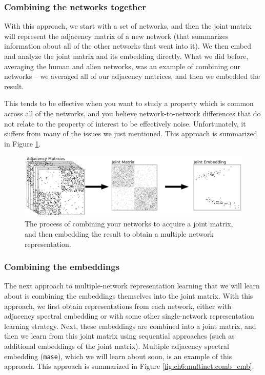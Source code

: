 \subsubsection{Combining the networks together}

With this approach, we start with a set of networks, and then the joint matrix will represent the adjacency matrix of a new network (that summarizes information about all of the other networks that went into it). We then embed and analyze the joint matrix and its embedding directly. What we did before, averaging the human and alien networks, was an example of combining our networks -- we  averaged all of our adjacency matrices, and then we embedded the result. 

This tends to be effective when you want to study a property which is common across all of the networks, and you believe network-to-network differences that do not relate to the property of interest to be effectively noise. Unfortunately, it suffers from many of the issues we just mentioned. This approach is summarized in Figure \ref{fig:ch6:multinet:comb}.

\begin{figure}[h]
    \centering
    \includegraphics[width=\linewidth]{representations/ch6/Images/joint_comb.png}
    \caption[Combining networks together]{The process of combining your networks to acquire a joint matrix, and then embedding the result to obtain a multiple network representation.}
    \label{fig:ch6:multinet:comb}
\end{figure}

\subsubsection{Combining the embeddings}

The next approach to multiple-network representation learning that we will learn about is combining the embeddings themselves into the joint matrix. With this approach, we first obtain representations from each network, either with adjacency spectral embedding or with some other single-network representation learning strategy. Next, these embeddings are combined into a joint matrix, and then we learn from this joint matrix using sequential approaches (such as additional embeddings of the joint matrix). Multiple adjacency spectral embedding (\texttt{mase}), which we will learn about soon, is an example of this approach. This approach is summarized in Figure \ref{fig:ch6:multinet:comb_emb}.

